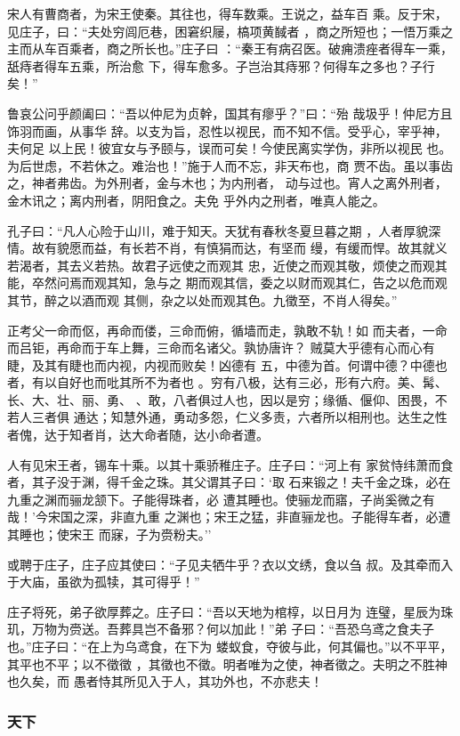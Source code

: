 \documentclass[]{article}
\begin{document}
宋人有曹商者，为宋王使秦。其往也，得车数乘。王说之，益车百
乘。反于宋，见庄子，曰：``夫处穷闾厄巷，困窘织屦，槁项黄馘者
，商之所短也；一悟万乘之主而从车百乘者，商之所长也。''庄子曰
：``秦王有病召医。破痈溃痤者得车一乘，舐痔者得车五乘，所治愈
下，得车愈多。子岂治其痔邪？何得车之多也？子行矣！''

鲁哀公问乎颜阖曰：``吾以仲尼为贞幹，国其有瘳乎？''曰：``殆
哉圾乎！仲尼方且饰羽而画，从事华
辞。以支为旨，忍性以视民，而不知不信。受乎心，宰乎神，夫何足
以上民！彼宜女与予颐与，误而可矣！今使民离实学伪，非所以视民
也。为后世虑，不若休之。难治也！''施于人而不忘，非天布也，商
贾不齿。虽以事齿之，神者弗齿。为外刑者，金与木也；为内刑者，
动与过也。宵人之离外刑者，金木讯之；离内刑者，阴阳食之。夫免
乎外内之刑者，唯真人能之。

孔子曰：``凡人心险于山川，难于知天。天犹有春秋冬夏旦暮之期
，人者厚貌深情。故有貌愿而益，有长若不肖，有慎狷而达，有坚而
缦，有缓而悍。故其就义若渴者，其去义若热。故君子远使之而观其
忠，近使之而观其敬，烦使之而观其能，卒然问焉而观其知，急与之
期而观其信，委之以财而观其仁，告之以危而观其节，醉之以酒而观
其侧，杂之以处而观其色。九徵至，不肖人得矣。''

正考父一命而伛，再命而偻，三命而俯，循墙而走，孰敢不轨！如
而夫者，一命而吕钜，再命而于车上舞，三命而名诸父。孰协唐许？
贼莫大乎德有心而心有睫，及其有睫也而内视，内视而败矣！凶德有
五，中德为首。何谓中德？中德也者，有以自好也而吡其所不为者也
。穷有八极，达有三必，形有六府。美、髯、长、大、壮、丽、勇、
、敢，八者俱过人也，因以是穷；缘循、偃仰、困畏，不若人三者俱
通达；知慧外通，勇动多怨，仁义多责，六者所以相刑也。达生之性
者傀，达于知者肖，达大命者随，达小命者遭。

人有见宋王者，锡车十乘。以其十乘骄稚庄子。庄子曰：``河上有
家贫恃纬萧而食者，其子没于渊，得千金之珠。其父谓其子曰：`取
石来锻之！夫千金之珠，必在九重之渊而骊龙颔下。子能得珠者，必
遭其睡也。使骊龙而寤，子尚奚微之有哉！'今宋国之深，非直九重
之渊也；宋王之猛，非直骊龙也。子能得车者，必遭其睡也；使宋王
而寐，子为赍粉夫。''

或聘于庄子，庄子应其使曰：``子见夫牺牛乎？衣以文绣，食以刍
叔。及其牵而入于大庙，虽欲为孤犊，其可得乎！''

庄子将死，弟子欲厚葬之。庄子曰：``吾以天地为棺椁，以日月为
连璧，星辰为珠玑，万物为赍送。吾葬具岂不备邪？何以加此！''弟
子曰：``吾恐乌鸢之食夫子也。''庄子曰：``在上为乌鸢食，在下为
蝼蚁食，夺彼与此，何其偏也。''以不平平，其平也不平；以不徵徵
，其徵也不徵。明者唯为之使，神者徵之。夫明之不胜神也久矣，而
愚者恃其所见入于人，其功外也，不亦悲夫！

\hypertarget{header-n2420}{%
\subsubsection{天下}\label{header-n2420}}
\end{document}
